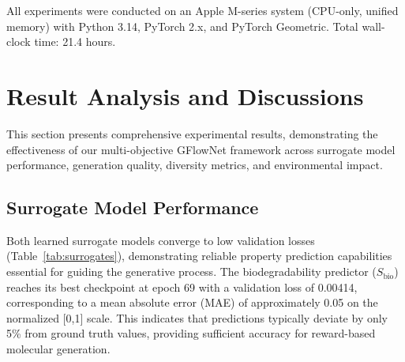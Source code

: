 \documentclass[twocolumn,10pt]{article}
\begin{document}
All experiments were conducted on an Apple M-series system (CPU-only, unified memory) with Python 3.14, PyTorch 2.x, and PyTorch Geometric. Total wall-clock time: 21.4 hours.

\begin{table}[!ht]
\centering
\caption{Key hyperparameters.}
\label{tab:hyperparams}
\end{table}


\section{Result Analysis and Discussions}

This section presents comprehensive experimental results, demonstrating the effectiveness of our multi-objective GFlowNet framework across surrogate model performance, generation quality, diversity metrics, and environmental impact.

\subsection{Surrogate Model Performance}

Both learned surrogate models converge to low validation losses (Table~\ref{tab:surrogates}), demonstrating reliable property prediction capabilities essential for guiding the generative process. The biodegradability predictor ($S_\text{bio}$) reaches its best checkpoint at epoch 69 with a validation loss of 0.00414, corresponding to a mean absolute error (MAE) of approximately 0.05 on the normalized [0,1] scale. This indicates that predictions typically deviate by only 5\% from ground truth values, providing sufficient accuracy for reward-based molecular generation.
\end{document}
